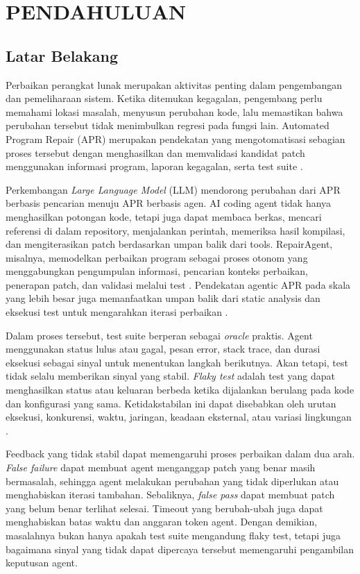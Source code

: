 \chapter{PENDAHULUAN}

\section{Latar Belakang}

Perbaikan perangkat lunak merupakan aktivitas penting dalam pengembangan dan pemeliharaan sistem. Ketika ditemukan kegagalan, pengembang perlu memahami lokasi masalah, menyusun perubahan kode, lalu memastikan bahwa perubahan tersebut tidak menimbulkan regresi pada fungsi lain. Automated Program Repair (APR) merupakan pendekatan yang mengotomatisasi sebagian proses tersebut dengan menghasilkan dan memvalidasi kandidat patch menggunakan informasi program, laporan kegagalan, serta test suite \cite{defects4j2014}.

Perkembangan \textit{Large Language Model} (LLM) mendorong perubahan dari APR berbasis pencarian menuju APR berbasis agen. AI coding agent tidak hanya menghasilkan potongan kode, tetapi juga dapat membaca berkas, mencari referensi di dalam repository, menjalankan perintah, memeriksa hasil kompilasi, dan mengiterasikan patch berdasarkan umpan balik dari tools. RepairAgent, misalnya, memodelkan perbaikan program sebagai proses otonom yang menggabungkan pengumpulan informasi, pencarian konteks perbaikan, penerapan patch, dan validasi melalui test \cite{repairagent2025}. Pendekatan agentic APR pada skala yang lebih besar juga memanfaatkan umpan balik dari static analysis dan eksekusi test untuk mengarahkan iterasi perbaikan \cite{maddila2026}.

Dalam proses tersebut, test suite berperan sebagai \textit{oracle} praktis. Agent menggunakan status lulus atau gagal, pesan error, stack trace, dan durasi eksekusi sebagai sinyal untuk menentukan langkah berikutnya. Akan tetapi, test tidak selalu memberikan sinyal yang stabil. \textit{Flaky test} adalah test yang dapat menghasilkan status atau keluaran berbeda ketika dijalankan berulang pada kode dan konfigurasi yang sama. Ketidakstabilan ini dapat disebabkan oleh urutan eksekusi, konkurensi, waktu, jaringan, keadaan eksternal, atau variasi lingkungan \cite{parry2022flaky,tahir2023flakiness}.

Feedback yang tidak stabil dapat memengaruhi proses perbaikan dalam dua arah. \textit{False failure} dapat membuat agent menganggap patch yang benar masih bermasalah, sehingga agent melakukan perubahan yang tidak diperlukan atau menghabiskan iterasi tambahan. Sebaliknya, \textit{false pass} dapat membuat patch yang belum benar terlihat selesai. Timeout yang berubah-ubah juga dapat menghabiskan batas waktu dan anggaran token agent. Dengan demikian, masalahnya bukan hanya apakah test suite mengandung flaky test, tetapi juga bagaimana sinyal yang tidak dapat dipercaya tersebut memengaruhi pengambilan keputusan agent.


